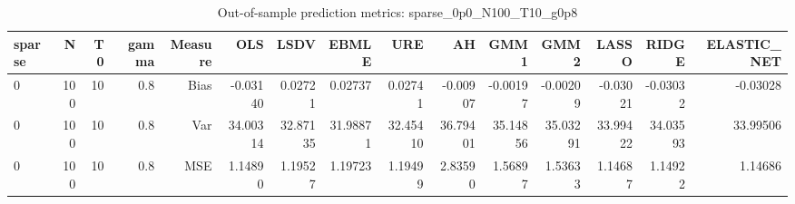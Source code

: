 \begin{table}[!htbp]\centering
\caption{Out-of-sample prediction metrics: sparse_0p0_N100_T10_g0p8}
\label{tab:table3_sparse_0p0_N100_T10_g0p8}
\begin{tabular}{lrrrrrrrrrrrrrr}
\hline
sparse & N & T0 & gamma & Measure & OLS & LSDV & EBMLE & URE & AH & GMM1 & GMM2 & LASSO & RIDGE & ELASTIC_NET \\
\hline
0 & 100 & 10 & 0.8 & Bias & -0.03140 & 0.02721 & 0.02737 & 0.02741 & -0.00907 & -0.00197 & -0.00209 & -0.03021 & -0.03032 & -0.03028 \\
0 & 100 & 10 & 0.8 & Var & 34.00314 & 32.87135 & 31.98871 & 32.45410 & 36.79401 & 35.14856 & 35.03291 & 33.99422 & 34.03593 & 33.99506 \\
0 & 100 & 10 & 0.8 & MSE & 1.14890 & 1.19527 & 1.19723 & 1.19499 & 2.83590 & 1.56897 & 1.53633 & 1.14687 & 1.14922 & 1.14686 \\
\hline
\end{tabular}
\end{table}

